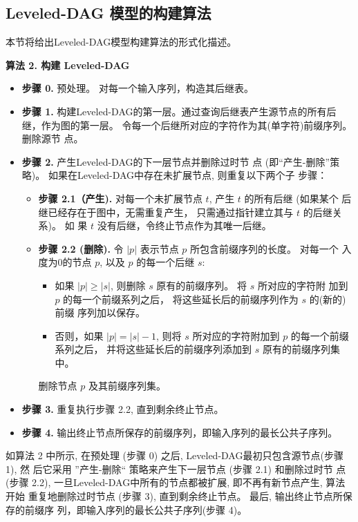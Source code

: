\documentclass[utf8]{frontiersSCNS} %
\begin{document}
\subsection{Leveled-DAG 模型的构建算法 }
\label{sec:PMA}

本节将给出Leveled-DAG模型构建算法的形式化描述。

\textbf{算法 2. 构建 Leveled-DAG}
\begin{itemize}
\item \textbf{步骤 0.} 预处理。 对每一个输入序列，构造其后继表。
\item \textbf{步骤 1.} 构建Leveled-DAG的第一层。通过查询后继表产生源节点的所有后
  继，作为图的第一层。 令每一个后继所对应的字符作为其(单字符)前缀序列。删除源节
  点。
\item \textbf{步骤 2.} 产生Leveled-DAG的下一层节点并删除过时节
  点 (即“产生-删除”策略)。 如果在Leveled-DAG中存在未扩展节点, 则重复以下两个子
  步骤：
  \begin{itemize}
  \item \textbf{步骤 2.1（产生).} 对每一个未扩展节点 $t$, 产生 $t$ 的所有后继 (如果某个
    后继已经存在于图中，无需重复产生， 只需通过指针建立其与 $t$ 的后继关系)。 如
    果 $t$ 没有后继，令终止节点作为其唯一后继。
  \item \textbf{步骤 2.2 (删除).} 令 $|p|$ 表示节点 $p$ 所包含前缀序列的长度。 对每一个
    入度为0的节点 $p$, 以及 $p$ 的每一个后继 $s$:
    \begin{itemize}
    \item 如果 $|p| \geq |s|$, 则删除 $s$ 原有的前缀序列。 将 $s$ 所对应的字符附
      加到 $p$ 的每一个前缀系列之后， 将这些延长后的前缀序列作为 $s$ 的(新的)前缀
      序列加以保存。
    \item 否则，如果 $|p| = |s|-1$, 则将 $s$ 所对应的字符附加到 $p$ 的每一个前缀
      系列之后， 并将这些延长后的前缀序列添加到 $s$ 原有的前缀序列集中。
    \end{itemize}
    删除节点 $p$ 及其前缀序列集。
  \end{itemize}
\item \textbf{步骤 3.} 重复执行步骤 2.2, 直到剩余终止节点。
\item \textbf{步骤 4.} 输出终止节点所保存的前缀序列，即输入序列的最长公共子序列。
\end{itemize}

如算法 2 中所示, 在预处理 (步骤 0) 之后, Leveled-DAG最初只包含源节点(步骤 1), 然
后它采用 ”产生-删除“ 策略来产生下一层节点 (步骤 2.1) 和删除过时节
点 (步骤 2.2), 一旦Leveled-DAG中所有的节点都被扩展, 即不再有新节点产生, 算法开始
重复地删除过时节点 (步骤 3), 直到剩余终止节点。 最后, 输出终止节点所保存的前缀序
列，即输入序列的最长公共子序列(步骤 4)。
\end{document}
